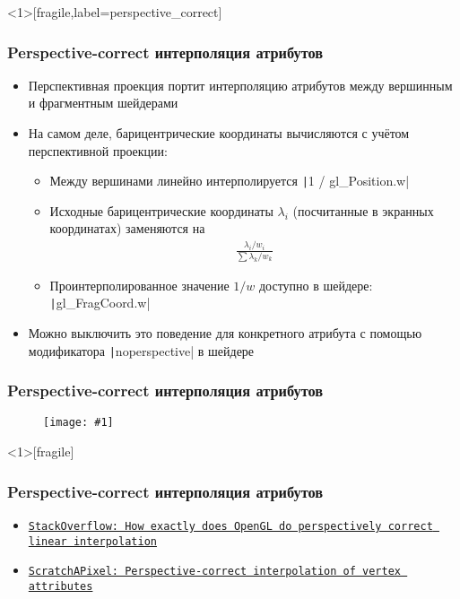 \documentclass[10pt]{beamer}
\newcommand{\slideimage}[1]{
  \begin{figure}
    \begin{adjustbox}{width=\textwidth, totalheight=\textheight-2\baselineskip-2\baselineskip,keepaspectratio}
      \texttt{[image: \#1]}
    \end{adjustbox}
  \end{figure}
}
\begin{document}
\begin{frame}<1>[fragile,label=perspective_correct]
\frametitle{Perspective-correct интерполяция атрибутов}
\begin{itemize}
\item Перспективная проекция портит интерполяцию атрибутов между вершинным и фрагментным шейдерами
\pause
\item На самом деле, барицентрические координаты вычисляются с учётом перспективной проекции:
\pause
\begin{itemize}
\item Между вершинами линейно интерполируется \texttt|1 / gl_Position.w|
\pause
\item Исходные барицентрические координаты \begin{math}\lambda_i\end{math} (посчитанные в экранных координатах) заменяются на
\begin{align*}
\frac{\lambda_i / w_i}{\sum \lambda_k / w_k}
\end{align*}
\pause
\item Проинтерполированное значение \begin{math}1/w\end{math} доступно в шейдере: \texttt|gl_FragCoord.w|
\end{itemize}
\pause
\item Можно выключить это поведение для конкретного атрибута с помощью модификатора \texttt|noperspective| в шейдере
\end{itemize}
\end{frame}

\begin{frame}[fragile]
\frametitle{Perspective-correct интерполяция атрибутов}
\slideimage{perspective-correct.png}
\end{frame}


\begin{frame}<1>[fragile]
\frametitle{Perspective-correct интерполяция атрибутов}
\begin{itemize}
\item \href{https://stackoverflow.com/questions/24441631/how-exactly-does-opengl-do-perspectively-correct-linear-interpolation}{\texttt{StackOverflow: How exactly does OpenGL do perspectively correct linear interpolation}}
\item \href{https://www.scratchapixel.com/lessons/3d-basic-rendering/rasterization-practical-implementation/perspective-correct-interpolation-vertex-attributes.html}{\texttt{ScratchAPixel: Perspective-correct interpolation of vertex attributes}}
\end{itemize}
\end{frame}
\end{document}
